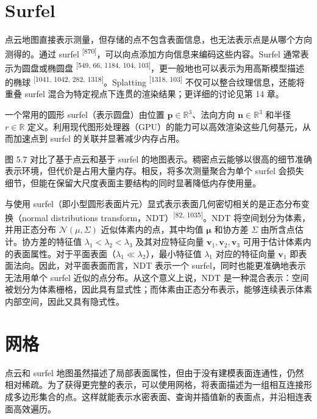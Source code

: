 \section{Surfel}

点云地图直接表示测量，但存储的点不包含表面信息，也无法表示点是从哪个方向测得的。通过 surfel \textsuperscript{[870]}，可以向点添加方向信息来编码这些内容。Surfel 通常表示为圆盘或椭圆盘 \textsuperscript{[549, 66, 1184, 104, 103]}，更一般地也可以表示为用高斯模型描述的椭球 \textsuperscript{[1041, 1042, 282, 1318]}。Splatting \textsuperscript{[1318, 103]} 不仅可以整合纹理信息，还能将重叠 surfel 混合为特定视点下连贯的渲染结果；更详细的讨论见第 14 章。

一个常用的圆形 surfel（表示圆盘）由位置 $\pmb { p } \in \mathbb { R } ^ { 3 }$、法向方向 $\mathbf { \boldsymbol { n } } \in \mathbb { R } ^ { 3 }$ 和半径 $r \in \mathbb { R }$ 定义。利用现代图形处理器（GPU）的能力可以高效渲染这些几何基元，从而加速点到 surfel 的关联并显著减少内存占用。

图 5.7 对比了基于点云和基于 surfel 的地图表示。稠密点云能够以很高的细节准确表示环境，但代价是占用大量内存。相反，将多次测量聚合为单个 surfel 会损失细节，但能在保留大尺度表面主要结构的同时显著降低内存使用量。

与使用 surfel（即小型圆形表面片元）显式表示表面几何密切相关的是正态分布变换（normal distributions transform，NDT）\textsuperscript{[82, 1035]}。NDT 将空间划分为体素，并用正态分布 $\mathcal { N } ( \mu , \Sigma )$ 近似体素内的点，其中均值 $\pmb { \mu }$ 和协方差 $\Sigma$ 由所含点估计。协方差的特征值 $\lambda _ { 1 } < \lambda _ { 2 } < \lambda _ { 3 }$ 及其对应特征向量 ${ \pmb v } _ { 1 }, { \pmb v } _ { 2 }, { \pmb v } _ { 3 }$ 可用于估计体素内的表面属性。对于平面表面（$\lambda _ { 1 } \ll \lambda _ { 2 }$），最小特征值 $\lambda _ { 1 }$ 对应的特征向量 ${ \pmb v } _ { 1 }$ 即表面法向。因此，对平面表面而言，NDT 表示一个 surfel，同时也能更准确地表示无法用单个 surfel 近似的点分布。从这个意义上说，NDT 是一种混合表示：空间被划分为体素栅格，因此具有显式性；而体素由正态分布表示，能够连续表示体素内部空间，因此又具有隐式性。

\section{网格}

点云和 surfel 地图虽然描述了局部表面属性，但由于没有建模表面连通性，仍然相对稀疏。为了获得更完整的表示，可以使用网格，将表面描述为一组相互连接形成多边形集合的点。这样就能表示水密表面、查询并插值新的表面点，并沿相连表面高效遍历。


